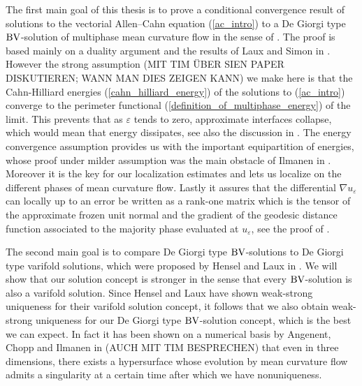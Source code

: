 The first main goal of this thesis is to prove a conditional convergence result 
of solutions to the vectorial Allen--Cahn equation (\ref{ac_intro}) to a De 
Giorgi type $ \operatorname{BV} $-solution of multiphase mean curvature flow in the sense of 
. The proof is based mainly on a duality 
argument and the results of Laux and Simon in 
\cite{convergence_of_allen_cahn_equation_to_multiphase_mean_curvature_flow}.
However the strong assumption (MIT TIM ÜBER SIEN PAPER DISKUTIEREN; WANN MAN 
DIES ZEIGEN KANN) we make here is that the Cahn-Hilliard energies 
(\ref{cahn_hilliard_energy}) of the solutions to (\ref{ac_intro}) converge to 
the perimeter functional (\ref{definition_of_multiphase_energy}) of the limit. 
This prevents that as $ \varepsilon $ tends to zero, approximate interfaces 
collapse, which would mean that energy dissipates, see also the discussion in
. The energy 
convergence assumption provides us with the important equipartition of 
energies, whose proof under milder assumption was the main obstacle of Ilmanen 
in \cite{ilmanen_convergence_of_ac_to_brakkes_mcf}. Moreover it is the key for 
our localization estimates and lets us localize on the different phases of mean 
curvature flow. Lastly it assures that the differential $ \nabla u_{ 
\varepsilon } $ can locally up to an error be written as a rank-one matrix which
is the tensor of the approximate frozen unit normal and the gradient of the 
geodesic 
distance function associated to the majority phase evaluated at $ u_{ 
\varepsilon } $, see the proof of .

The second main goal is to compare De Giorgi type $ \operatorname{BV} $-solutions to De 
Giorgi type varifold solutions, which were 
proposed by Hensel and Laux in 
\cite{hensel_laux_varifold_solution_concept_for_mean_curvature_flow}. We will 
show that our solution concept is stronger in the sense that every $ \operatorname{BV} 
$-solution is also a varifold solution. Since Hensel and Laux have shown 
weak-strong uniqueness for their varifold solution concept, it follows that we 
also obtain weak-strong uniqueness for our De Giorgi type $ \operatorname{BV} $-solution 
concept, which is the best we can expect. In fact it has been shown on a 
numerical basis by Angenent, Chopp and Ilmanen in 
\cite{angenent_chopp_ilmanen_a_computed_example_of_nonuniqueness_of_mcf}
(AUCH MIT TIM BESPRECHEN)
that even in three dimensions, there exists a hypersurface whose evolution by 
mean curvature 
flow admits a singularity at a certain time after which we have nonuniqueness.

